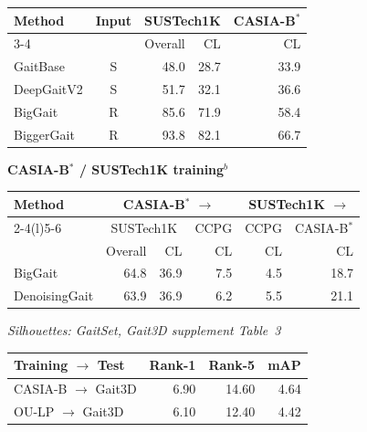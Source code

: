 \begin{table}[t]
\begin{minipage}[t]{0.49\textwidth}
\begin{tabular*}{\linewidth}{@{\extracolsep{\fill}}lcrrr@{}}
\toprule
\multirow{2}{*}{Method} & \multirow{2}{*}{Input} & \multicolumn{2}{c}{SUSTech1K} & CASIA-B$^*$\\
\cmidrule(lr){3-4}
& & Overall & CL & CL\\
\midrule
GaitBase & S & 48.0 & 28.7 & 33.9 \\
DeepGaitV2 & S & 51.7 & 32.1 & 36.6 \\
BigGait & R & 85.6 & 71.9 & 58.4 \\
BiggerGait & R & 93.8 & 82.1 & 66.7 \\
\bottomrule
\end{tabular*}
\par\vspace{4pt}
\textbf{CASIA-B$^*$ / SUSTech1K training}$^b$\par\vspace{2pt}
\begin{tabular*}{\linewidth}{@{\extracolsep{\fill}}lrrrrr@{}}
\toprule
\multirow{2}{*}{Method} & \multicolumn{3}{c}{CASIA-B$^*$ $\rightarrow$} & \multicolumn{2}{c}{SUSTech1K $\rightarrow$}\\
\cmidrule(lr){2-4}\cmidrule(l){5-6}
& \multicolumn{2}{c}{SUSTech1K} & CCPG & CCPG & CASIA-B$^*$\\
& Overall & CL & CL & CL & CL\\
\midrule
BigGait & 64.8 & 36.9 & 7.5 & 4.5 & 18.7 \\
DenoisingGait & 63.9 & 36.9 & 6.2 & 5.5 & 21.1 \\
\bottomrule
\end{tabular*}
\end{minipage}
\par\vspace{5pt}
\noindent{}\par\vspace{3pt}
\begin{minipage}[t]{0.49\textwidth}
\textit{Silhouettes: GaitSet, Gait3D supplement Table~3~\cite{zheng2022gait}}\par\vspace{2pt}
\begin{tabular*}{\linewidth}{@{\extracolsep{\fill}}lrrr@{}}
\toprule
Training $\rightarrow$ Test & Rank-1 & Rank-5 & mAP\\
\midrule
CASIA-B $\rightarrow$ Gait3D & 6.90 & 14.60 & 4.64 \\
OU-LP $\rightarrow$ Gait3D & 6.10 & 12.40 & 4.42 \\

\end{tabular*}
\end{minipage}
\end{table}
